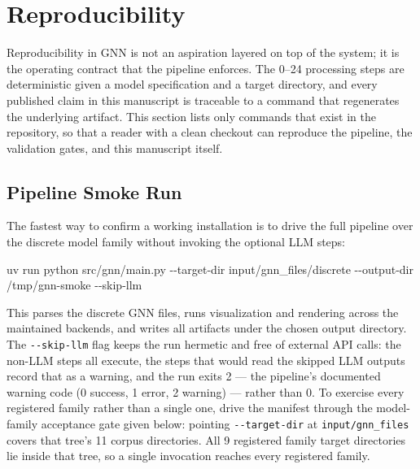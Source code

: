 \documentclass[
  english,
  9pt,
]{extarticle}
\newenvironment{Shaded}{}{}
\newcommand{\AttributeTok}[1]{\textcolor[rgb]{0.49,0.56,0.16}{#1}}
\newcommand{\ExtensionTok}[1]{#1}
\newcommand{\NormalTok}[1]{#1}
\begin{document}
\newpage

\section{Reproducibility}\label{sec:reproducibility}

Reproducibility in GNN is not an aspiration layered on top of the
system; it is the operating contract that the pipeline enforces. The
0--24 processing steps are deterministic given a model specification and
a target directory, and every published claim in this manuscript is
traceable to a command that regenerates the underlying artifact. This
section lists only commands that exist in the repository, so that a
reader with a clean checkout can reproduce the pipeline, the validation
gates, and this manuscript itself.

\subsection{Pipeline Smoke Run}\label{pipeline-smoke-run}

The fastest way to confirm a working installation is to drive the full
pipeline over the discrete model family without invoking the optional
LLM steps:

\begin{Shaded}
\begin{Highlighting}[]
\ExtensionTok{uv}\NormalTok{ run python src/gnn/main.py }\AttributeTok{{-}{-}target{-}dir}\NormalTok{ input/gnn\_files/discrete }\AttributeTok{{-}{-}output{-}dir}\NormalTok{ /tmp/gnn{-}smoke }\AttributeTok{{-}{-}skip{-}llm}
\end{Highlighting}
\end{Shaded}

This parses the discrete GNN files, runs visualization and rendering
across the maintained backends, and writes all artifacts under the
chosen output directory. The \texttt{-\/-skip-llm} flag keeps the run
hermetic and free of external API calls: the non-LLM steps all execute,
the steps that would read the skipped LLM outputs record that as a
warning, and the run exits 2 --- the pipeline's documented warning code
(0 success, 1 error, 2 warning) --- rather than 0. To exercise every
registered family rather than a single one, drive the manifest through
the model-family acceptance gate given below: pointing
\texttt{-\/-target-dir} at \texttt{input/gnn\_files} covers that tree's
11 corpus directories. All 9 registered family target directories lie
inside that tree, so a single invocation reaches every registered
family.
\end{document}
